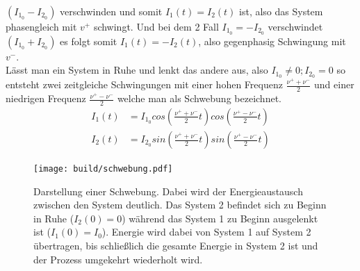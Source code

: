 $(I_{1_0}-I_{2_0})$ verschwinden und somit $I_1(t)=I_2(t)$ ist, also das System phasengleich mit $v^+$ schwingt. 
Und bei dem 2 Fall $I_{1_0}=-I_{2_0}$ verschwindet $(I_{1_0}+I_{2_0})$ es 
folgt somit $I_1(t)=-I_2(t)$, also gegenphasig Schwingung mit $v^-$.\\
Lässt man ein System in Ruhe und lenkt das andere aus, also $I_{1_0}\neq 0; I_{2_0}=0$
so entsteht zwei zeitgleiche Schwingungen mit einer hohen Frequenz $\frac{\nu^+ + \nu^-}{2}$
und einer niedrigen Frequenz $\frac{\nu^+ - \nu^-}{2}$ welche man als Schwebung bezeichnet.
\begin{align}
    I_1(t)&=I_{1_0}cos(\frac{\nu^+ + \nu^-}{2}t)cos(\frac{\nu^+ - \nu^-}{2}t)\\ 
    I_2(t)&=I_{2_0}sin(\frac{\nu^+ + \nu^-}{2}t)sin(\frac{\nu^+ - \nu^-}{2}t)
\end{align}
\begin{figure}[H]
    \centering
    \texttt{[image: build/schwebung.pdf]}
    \caption{
        Darstellung einer Schwebung. Dabei wird der Energieaustausch zwischen den System deutlich.
        Das System 2 befindet sich zu Beginn in Ruhe ($I_2(0)=0$) während das System 1 zu Beginn ausgelenkt ist
        ($I_1(0)=I_0$). Energie wird dabei von System 1 auf System 2 übertragen, bis schließlich die gesamte 
        Energie in System 2 ist und der Prozess umgekehrt wiederholt wird.
    }
\end{figure}


